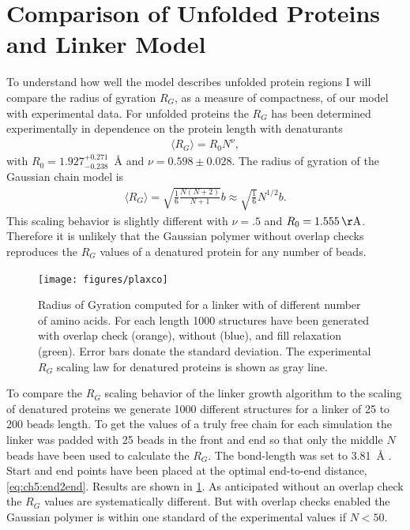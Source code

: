 \documentclass[12pt, twoside]{report}
\begin{document}
\section{Comparison of Unfolded Proteins and Linker Model} To understand
how well the model describes unfolded protein regions I will compare the radius
of gyration $R_G$, as a measure of compactness, of our model with experimental
data. For unfolded proteins the $R_G$ has been determined experimentally in
dependence on the protein length with denaturants \cite{Kohn2004}
\begin{align}
  \label{eq:ch5:plaxco} \langle R_G\rangle = R_0 N^{\nu},
\end{align} with \(R_0=1.927_{-0.238}^{+0.271}\)\SI{}{\AA} and \(\nu=0.598 \pm
0.028\). The radius of gyration of the Gaussian chain model is
\begin{align}
\label{eq:ch5:rg} \langle R_G\rangle = \sqrt{\frac{1}{6} \frac{N (N+2)}{N+1}} b
\approx \sqrt{\frac{1}{6}} N^{1/2} b.
\end{align} This scaling behavior is slightly different with \(\nu=.5\) and
\(R_0=\SI{1.555}{\AA}\). Therefore it is unlikely that the Gaussian polymer
without overlap checks reproduces the $R_G$ values of a denatured protein for
any number of beads.
\begin{figure}[!ht]
  \centering \texttt{[image: figures/plaxco]}
  \caption[Radius of gyration of Gaussian polymer chain for different chain
  lengths.]{Radius of Gyration computed for a linker with of different number of
    amino acids. For each length 1000 structures have been generated with
    overlap check (orange), without (blue), and fill relaxation (green). Error
    bars donate the standard deviation. The experimental $R_G$ scaling law for
    denatured proteins \cite{Kohn2004} is shown as gray line.}
\label{fig:plaxco}
\end{figure} To compare the \(R_G\) scaling behavior of the linker growth
algorithm to the scaling of denatured proteins we generate 1000 different
structures for a linker of 25 to 200 beads length. To get the values of a truly
free chain for each simulation the linker was padded with 25 beads in the front
and end so that only the middle $N$ beads have been used to calculate the $R_G$.
The bond-length was set to \SI{3.81}{\AA} \cite{Best2005}. Start and end points
have been placed at the optimal end-to-end distance, \cref{eq:ch5:end2end}.
Results are shown in \cref{fig:plaxco}. As anticipated without an overlap check
the $R_G$ values are systematically different. But with overlap checks enabled
the Gaussian polymer is within one standard of the experimental values if
$N<50$.
\end{document}
